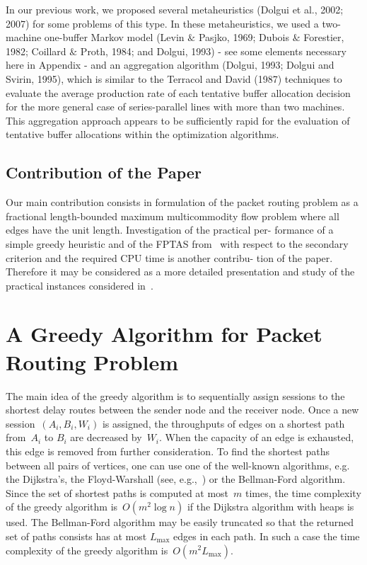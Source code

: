 \documentclass{ifacconf}
\begin{document}
In our previous work, we proposed several metaheuristics (Dolgui et al., 2002; 2007) for 
some problems of this type. In these metaheuristics, we used a two-machine one-buffer 
Markov  model  (Levin  $\&$  Pasjko,  1969;  Dubois  $\&$  Forestier,  1982;  Coillard  $\&$  Proth, 
1984;  and  Dolgui,  1993)  -  see  some  elements  necessary  here  in  Appendix  -  and  an 
aggregation algorithm (Dolgui, 1993; Dolgui and Svirin, 1995), which is similar to the 
Terracol and David (1987) techniques to evaluate the average production rate of each 
tentative buffer allocation decision for the more general case of series-parallel lines with 
more than two machines. This aggregation approach appears to be sufficiently rapid for 
the evaluation of tentative buffer allocations within the optimization algorithms. 

\subsection{Contribution of the Paper}
Our main contribution consists in formulation of the
packet routing problem as a fractional length-bounded
maximum multicommodity flow problem where all edges
have the unit length. Investigation of the practical per-
formance of a simple greedy heuristic and of the FPTAS
from~\cite{BEHTV19} with respect to the secondary
criterion and the required CPU time is another contribu-
tion of the paper. Therefore it may be considered as a more
detailed presentation and study of the practical instances
considered in~\cite{BEHTV19}.


\section{A Greedy Algorithm for Packet Routing Problem} \label{subsec:greedy}

The main idea of the greedy algorithm is to sequentially
assign sessions to the shortest delay routes between the
sender node and the receiver node. Once a new
session~$(A_i,B_i,W_i)$ is assigned, the throughputs of edges on
a shortest path from~$A_i$ to $B_i$ are decreased by~$W_i$.
When the capacity of an edge is exhausted, this edge is
removed from further consideration. To find the shortest paths
between all pairs of vertices, one can use one of the well-known algorithms,
e.g. the  Dijkstra's, the Floyd-Warshall (see, e.g.,~\cite{CLRC01}) or the Bellman-Ford algorithm.
Since the set of shortest paths is computed at most~$m$ times, the time complexity
of the greedy algorithm is~$O(m^2\log n)$ if the Dijkstra algorithm
with heaps is used. The Bellman-Ford algorithm may be easily truncated so that the returned set of paths consists 
has at most $L_{\max}$ edges in each path. In such a case the time 
complexity of the greedy algorithm is~$O(m^2 L_{\max})$.
\end{document}
